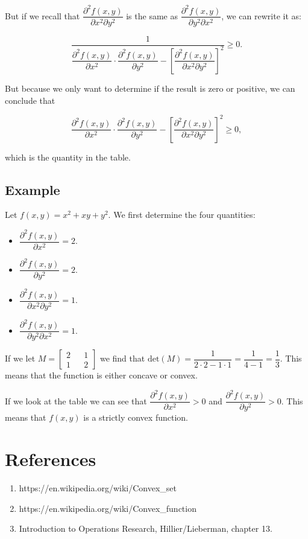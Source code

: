 \documentclass[11pt]{article}
\providecommand{\tightlist}{%
      \setlength{\itemsep}{0pt}\setlength{\parskip}{0pt}}
\begin{document}
    But if we recall that
\(\dfrac{\partial^2 f(x,y)}{\partial x^2 \partial y^2}\) is the same as
\(\dfrac{\partial^2 f(x,y)}{\partial y^2 \partial x^2}\), we can rewrite
it as:

\[ \dfrac{1}{\dfrac{\partial^2 f(x,y)}{\partial x^2} \cdot \dfrac{\partial^2 f(x,y)}{\partial y^2} - \left[\dfrac{\partial^2 f(x,y)}{\partial x^2 \partial y^2}\right]^2  } \geq 0.\]

But because we only want to determine if the result is zero or positive,
we can conclude that

\[ \dfrac{\partial^2 f(x,y)}{\partial x^2} \cdot \dfrac{\partial^2 f(x,y)}{\partial y^2} - \left[\dfrac{\partial^2 f(x,y)}{\partial x^2 \partial y^2}\right]^2 \geq 0,\]

which is the quantity in the table.

    \hypertarget{example}{%
\subsection{Example}\label{example}}

    Let \(f(x,y)=x^2+xy+y^2\). We first determine the four quantities:

\begin{itemize}
\tightlist
\item
  \(\dfrac{\partial^2 f(x,y)}{\partial x^2} = 2\).
\item
  \(\dfrac{\partial^2 f(x,y)}{\partial y^2} = 2\).
\item
  \(\dfrac{\partial^2 f(x,y)}{\partial x^2 \partial y^2} = 1\).
\item
  \(\dfrac{\partial^2 f(x,y)}{\partial y^2 \partial x^2} = 1\).
\end{itemize}

If we let \(M=\begin{bmatrix} 2 && 1 \\ 1 && 2 \end{bmatrix}\) we find
that
\(\textrm{det}(M)=\dfrac{1}{2\cdot2-1\cdot1} = \dfrac{1}{4-1} = \dfrac{1}{3}\).
This means that the function is either concave or convex.

If we look at the table we can see that
\(\dfrac{\partial^2 f(x,y)}{\partial x^2} > 0\) and
\(\dfrac{\partial^2 f(x,y)}{\partial y^2} > 0\). This means that
\(f(x,y)\) is a strictly convex function.

    \hypertarget{references}{%
\section{References}\label{references}}

    \begin{enumerate}
\def\labelenumi{\arabic{enumi}.}
\tightlist
\item
  https://en.wikipedia.org/wiki/Convex\_set
\item
  https://en.wikipedia.org/wiki/Convex\_function
\item
  Introduction to Operations Research, Hillier/Lieberman, chapter 13.
\end{enumerate}


    
    
    
    
\end{document}

